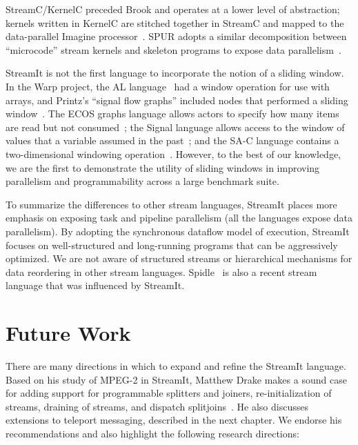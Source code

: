 Stream\-C/Ker\-nel\-C preceded Brook and operates at a lower level of
abstraction; kernels written in KernelC are stitched together in
StreamC and mapped to the data-parallel Imagine
processor~\cite{imagine03ieee}.  SPUR adopts a similar decomposition
between ``microcode'' stream kernels and skeleton programs to expose
data parallelism~\cite{spur05samos}.

StreamIt is not the first language to incorporate the notion of a
sliding window.  In the Warp project, the AL
language~\cite{tseng89thesis} had a window operation for use with
arrays, and Printz's ``signal flow graphs'' included nodes that
performed a sliding window~\cite{printz91thesis}.  The ECOS graphs
language allows actors to specify how many items are read but not
consumed~\cite{huang_ecos_1992}; the Signal language allows access to
the window of values that a variable assumed in the
past~\cite{le_guernic_signal--data_1986}; and the SA-C language
contains a two-dimensional windowing
operation~\cite{draper_compiling_2001}.  However, to the best of our
knowledge, we are the first to demonstrate the utility of sliding
windows in improving parallelism and programmability across a large
benchmark suite.

To summarize the differences to other stream languages, StreamIt
places more emphasis on exposing task and pipeline parallelism (all
the languages expose data parallelism).
By adopting the synchronous dataflow model of execution, StreamIt
focuses on well-structured and long-running programs that can be
aggressively optimized.  We are not aware of structured streams or
hierarchical mechanisms for data reordering in other stream languages.
Spidle~\cite{spidle03} is also a recent stream language that was
influenced by StreamIt.

\section{Future Work}
\label{sec:lang-future-work}

\vspace{12pt}

There are many directions in which to expand and refine the StreamIt
language.  Based on his study of MPEG-2 in StreamIt, Matthew Drake
makes a sound case for adding support for programmable splitters and
joiners, re-initialization of streams, draining of streams, and
dispatch splitjoins~\cite{drake-thesis}.  He also discusses extensions
to teleport messaging, described in the next chapter.  We endorse his
recommendations and also highlight the following research directions:

